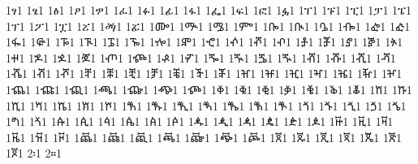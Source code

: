 {1ፃ1 %
1ፄ1 %
1ፅ1 %
1ፆ1 %
1ፇ1 %
1ፈ1 %
1ፉ1 %
1ፊ1 %
1ፋ1 %
1ፌ1 %
1ፍ1 %
1ፎ1 %
1ፏ1 %
1ፐ1 %
1ፑ1 %
1ፒ1 %
1ፓ1 %
1ፔ1 %
1ፕ1 %
1ፖ1 %
1ፗ1 %
1ፘ1 %
1ፙ1 %
1ፚ1 %
1ᎀ1 %
1ᎁ1 %
1ᎂ1 %
1ᎃ1 %
1ᎄ1 %
1ᎅ1 %
1ᎆ1 %
1ᎇ1 %
1ᎈ1 %
1ᎉ1 %
1ᎊ1 %
1ᎋ1 %
1ᎌ1 %
1ᎍ1 %
1ᎎ1 %
1ᎏ1 %
1ⶀ1 %
1ⶁ1 %
1ⶂ1 %
1ⶃ1 %
1ⶄ1 %
1ⶅ1 %
1ⶆ1 %
1ⶇ1 %
1ⶈ1 %
1ⶉ1 %
1ⶊ1 %
1ⶋ1 %
1ⶌ1 %
1ⶍ1 %
1ⶎ1 %
1ⶏ1 %
1ⶐ1 %
1ⶑ1 %
1ⶒ1 %
1ⶓ1 %
1ⶔ1 %
1ⶕ1 %
1ⶖ1 %
1ⶠ1 %
1ⶡ1 %
1ⶢ1 %
1ⶣ1 %
1ⶤ1 %
1ⶥ1 %
1ⶦ1 %
1ⶨ1 %
1ⶩ1 %
1ⶪ1 %
1ⶫ1 %
1ⶬ1 %
1ⶭ1 %
1ⶮ1 %
1ⶰ1 %
1ⶱ1 %
1ⶲ1 %
1ⶳ1 %
1ⶴ1 %
1ⶵ1 %
1ⶶ1 %
1ⶸ1 %
1ⶹ1 %
1ⶺ1 %
1ⶻ1 %
1ⶼ1 %
1ⶽ1 %
1ⶾ1 %
1ⷀ1 %
1ⷁ1 %
1ⷂ1 %
1ⷃ1 %
1ⷄ1 %
1ⷅ1 %
1ⷆ1 %
1ⷈ1 %
1ⷉ1 %
1ⷊ1 %
1ⷋ1 %
1ⷌ1 %
1ⷍ1 %
1ⷎ1 %
1ⷐ1 %
1ⷑ1 %
1ⷒ1 %
1ⷓ1 %
1ⷔ1 %
1ⷕ1 %
1ⷖ1 %
1ⷘ1 %
1ⷙ1 %
1ⷚ1 %
1ⷛ1 %
1ⷜ1 %
1ⷝ1 %
1ⷞ1 %
1ꬁ1 %
1ꬂ1 %
1ꬃ1 %
1ꬄ1 %
1ꬅ1 %
1ꬆ1 %
1ꬉ1 %
1ꬊ1 %
1ꬋ1 %
1ꬌ1 %
1ꬍ1 %
1ꬎ1 %
1ꬑ1 %
1ꬒ1 %
1ꬓ1 %
1ꬔ1 %
1ꬕ1 %
1ꬖ1 %
1ꬠ1 %
1ꬡ1 %
1ꬢ1 %
1ꬣ1 %
1ꬤ1 %
1ꬥ1 %
1ꬦ1 %
1ꬨ1 %
1ꬩ1 %
1ꬪ1 %
1ꬫ1 %
1ꬬ1 %
1ꬭ1 %
1ꬮ1 %
2፡1 %
2።1 %
}